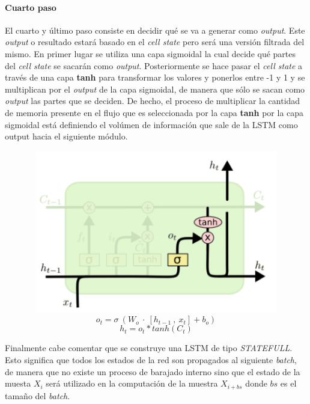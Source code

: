 \documentclass[]{DissertateUSU}
\let\oldparagraph\paragraph
\renewcommand{\paragraph}[1]{\oldparagraph{#1}\mbox{}}
\begin{document}
\centering

\setlength\parskip{5ex}
\justifying

\hypertarget{cuarto-paso}{%
\paragraph{Cuarto paso}\label{cuarto-paso}}

\noindent El cuarto y último paso consiste en decidir qué se va a
generar como \emph{output}. Este \emph{output} o resultado estará basado
en el \emph{cell state} pero será una versión filtrada del mismo. En
primer lugar se utiliza una capa sigmoidal la cual decide qué partes del
\emph{cell state} se sacarán como \emph{output}. Posteriormente se hace
pasar el \emph{cell state} a través de una capa \textbf{tanh} para
transformar los valores y ponerlos entre -1 y 1 y se multiplican por el
\emph{output} de la capa sigmoidal, de manera que sólo se sacan como
\emph{output} las partes que se deciden. De hecho, el proceso de
multiplicar la cantidad de memoria presente en el flujo que es
seleccionada por la capa \textbf{tanh} por la capa sigmoidal está
definiendo el volúmen de información que sale de la LSTM como output
hacia el siguiente módulo.

\centering

\includegraphics[width=6.25in,height=2.8125in]{laststeplstm.png}
\[o_t = \sigma \ (W_o \ \cdot \ [h_{t-1} \ , \ x_t] + b_o)\]
\[h_t=o_t * tanh(C_t)\]

\centering

\setlength\parskip{5ex}
\justifying

\noindent Finalmente cabe comentar que se construye una LSTM de tipo
\emph{STATEFULL}. Esto significa que todos los estados de la red son
propagados al siguiente \emph{batch}, de manera que no existe un proceso
de barajado interno sino que el estado de la muesta \(X_i\) será
utilizado en la computación de la muestra \(X_{i+bs}\) donde \(bs\) es
el tamaño del \emph{batch}.
\end{document}
